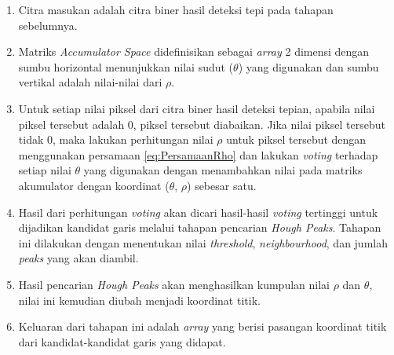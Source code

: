 \begin{enumerate}
	\item Citra masukan adalah citra biner hasil deteksi tepi pada tahapan sebelumnya.
	\item Matriks \textit{Accumulator Space} didefinisikan sebagai \textit{array} 2 dimensi dengan sumbu horizontal menunjukkan nilai sudut ($\theta$) yang digunakan dan sumbu vertikal adalah nilai-nilai dari $\rho$.
	
	\begin{adjustbox}{width=1\textwidth}
		\noindent
		\begin{minipage}{\linewidth}
			\centering{}
			\label{fig:MatriksAccumulatorSpace}
		\end{minipage}
	\end{adjustbox}
	\item Untuk setiap nilai piksel dari citra biner hasil deteksi tepian, apabila nilai piksel tersebut adalah 0, piksel tersebut diabaikan. Jika nilai piksel tersebut tidak 0, maka lakukan perhitungan nilai $\rho$ untuk piksel tersebut dengan menggunakan persamaan \ref{eq:PersamaanRho} dan lakukan \textit{voting} terhadap setiap nilai $\theta$ yang digunakan dengan menambahkan nilai pada matriks akumulator dengan koordinat ($\theta$, $\rho$) sebesar satu.
	\item Hasil dari perhitungan \textit{voting} akan dicari hasil-hasil \textit{voting} tertinggi untuk dijadikan kandidat garis melalui tahapan pencarian \textit{Hough Peaks}. Tahapan ini dilakukan dengan menentukan nilai \textit{threshold}, \textit{neighbourhood}, dan jumlah \textit{peaks} yang akan diambil.
	\item Hasil pencarian \textit{Hough Peaks} akan menghasilkan kumpulan nilai $\rho$ dan $\theta$, nilai ini kemudian diubah menjadi koordinat titik.
	\item Keluaran dari tahapan ini adalah \textit{array} yang berisi pasangan koordinat titik dari kandidat-kandidat garis yang didapat.\\
\end{enumerate}

